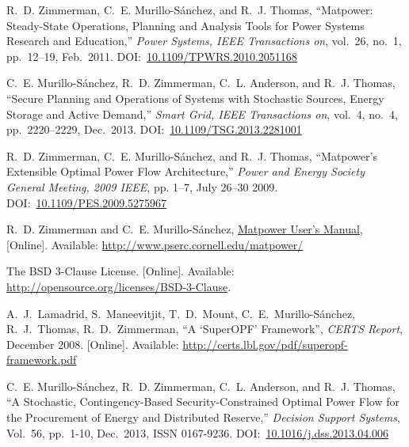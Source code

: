 \documentclass[12pt]{article}
\newcommand{\mpver}[0]{6.1-dev}
\newcommand{\matpower}[0]{{\sc Matpower}}
\newcommand{\matpowerurl}[0]{http://www.pserc.cornell.edu/matpower/}
\newcommand{\mumurl}[0]{http://www.pserc.cornell.edu/matpower/docs/MATPOWER-manual-\mpver.pdf}
\newcommand{\mum}[0]{\href{\mumurl}{\matpower{} User's Manual}}
\numberwithin{equation}{section}
\numberwithin{table}{section}
\numberwithin{figure}{section}
\begin{document}
\clearpage
\begin{thebibliography}{99}
R.~D. Zimmerman, C.~E. Murillo-S{\'a}nchez, and R.~J. Thomas,
  ``\matpower{}: Steady-State Operations, Planning and Analysis Tools for Power Systems Research and Education,'' \emph{Power Systems, IEEE Transactions on}, vol.~26, no.~1, pp.~12--19, Feb.~2011.
DOI:~\href{https://doi.org/10.1109/TPWRS.2010.2051168}{10.1109/TPWRS.2010.2051168}

C.~E. Murillo-S{\'a}nchez, R.~D. Zimmerman, C.~L. Anderson, and R.~J. Thomas, ``Secure Planning and Operations of Systems with Stochastic Sources, Energy Storage and Active Demand,'' \emph{Smart Grid, IEEE Transactions on}, vol.~4, no.~4, pp.~2220--2229, Dec.~2013.
DOI:~\href{https://doi.org/10.1109/TSG.2013.2281001}{10.1109/TSG.2013.2281001}

R.~D. Zimmerman, C.~E. Murillo-S{\'a}nchez, and R.~J. Thomas, ``\matpower{}'s
Extensible Optimal Power Flow Architecture,'' \emph{Power and Energy Society
General Meeting, 2009 IEEE}, pp. 1--7, July 26--30 2009.
DOI:~\href{https://doi.org/10.1109/PES.2009.5275967}{10.1109/PES.2009.5275967}

R.~D. Zimmerman and C.~E. Murillo-S{\'a}nchez, \mum{},
  [Online]. Available: \url{\matpowerurl}

The BSD 3-Clause License. [Online]. Available: \url{http://opensource.org/licenses/BSD-3-Clause}.

A.~J.~Lamadrid, S.~Maneevitjit, T.~D.~Mount, C.~E.~Murillo-S{\'a}nchez,
  R.~J.~Thomas, R.~D.~Zimmerman, ``A `SuperOPF' Framework'', \emph{CERTS
  Report}, December 2008.
  [Online]. Available: \url{http://certs.lbl.gov/pdf/superopf-framework.pdf}

C.~E. Murillo-S{\'a}nchez, R.~D. Zimmerman, C.~L. Anderson, and R.~J. Thomas, ``A Stochastic, Contingency-Based Security-Constrained Optimal Power Flow for the Procurement of Energy and Distributed Reserve,'' \emph{Decision Support Systems}, Vol.~56, pp.~1-10, Dec.~2013, ISSN 0167-9236.
DOI:~\href{https://doi.org/10.1016/j.dss.2013.04.006}{10.1016/j.dss.2013.04.006}

\end{thebibliography}
\end{document}
